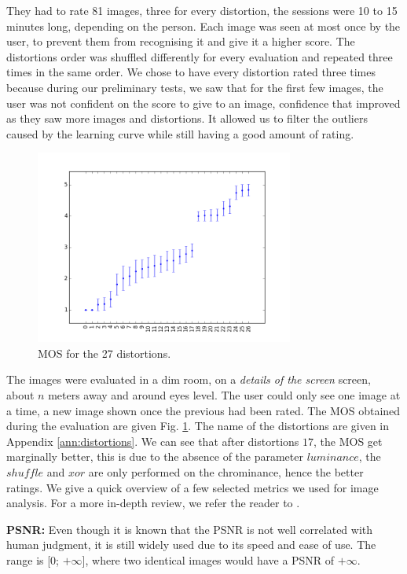 \documentclass{article}
\begin{document}
They had to rate 81 images, three for every distortion, the sessions were 10 to 15 minutes long, depending on the person. Each image was seen at most once by the user, to prevent them from recognising it and give it a higher score. The distortions order was shuffled differently for every evaluation and repeated three times in the same order. We chose to have every distortion rated three times because during our preliminary tests, we saw that for the first few images, the user was not confident on the score to give to an image, confidence that improved as they saw more images and distortions. It allowed us to filter the outliers caused by the learning curve while still having a good amount of rating.

\begin{figure}[H]
  \centering
  \includegraphics[width=8.5cm]{figures/mos}
  \vspace{-5mm}
  \caption{MOS for the 27 distortions.\label{fig:mos} }
\end{figure}

The images were evaluated in a dim room, on a \textit{details of the screen} screen, about $n$ meters away and around eyes level. The user could only see one image at a time, a new image shown once the previous had been rated.
The MOS obtained during the evaluation are given Fig. \ref{fig:mos}. The name of the distortions are given in Appendix \ref{ann:distortions}. We can see that after distortions $17$, the MOS get marginally better, this is due to the absence of the parameter $luminance$, the $shuffle$ and $xor$ are only performed on the chrominance, hence the better ratings.
We give a quick overview of a few selected metrics we used for image analysis. For a more in-depth review, we refer the reader to \cite{hofbauer2016identifying}.

\textbf{PSNR:} Even though it is known that the PSNR is not well correlated with human judgment, it is still widely used due to its speed and ease of use. The range is [0; $+\infty$], where two identical images would have a PSNR of $+\infty$.
\end{document}

